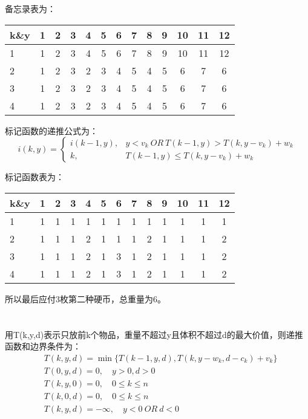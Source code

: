 \documentclass{article}
\begin{document}
\begin{CJK}{UTF8}{gbsn}
备忘录表为：
\begin{tabular}[t]{l|c|c|c|c|c|c|c|c|c|c|c|c}
\hline
k\&y & 1 & 2 & 3 & 4 & 5 & 6 & 7 & 8 & 9 & 10 & 11 & 12  \\
\hline
1   & 1  & 2 & 3 & 4 & 5 & 6 & 7 & 8 & 9 & 10 & 11 & 12  \\
\hline
2   & 1  & 2 & 3 & 2 & 3 & 4 & 5 & 4 & 5 & 6 & 7 & 6  \\
\hline
3   & 1  & 2 & 3 & 2 & 3 & 4 & 5 & 4 & 5 & 6 & 7 & 6  \\
\hline
4   & 1  & 2 & 3 & 2 & 3 & 4 & 5 & 4 & 5 & 6 & 7 & 6  \\
\hline
\end{tabular}

标记函数的递推公式为：
\begin{displaymath}
i(k,y)=\left\{
\begin{array}{ll}
i(k-1,y),   & y<v_k\ OR\ T(k-1,y) > T(k,y-v_k)+w_k \\
k,          & T(k-1,y) \le T(k,y-v_k)+w_k 
\end{array} \right.
\end{displaymath}

标记函数表为：
\begin{tabular}[t]{l|c|c|c|c|c|c|c|c|c|c|c|c}
\hline
k\&y & 1 & 2 & 3 & 4 & 5 & 6 & 7 & 8 & 9 & 10 & 11 & 12  \\
\hline
1   & 1 & 1 & 1 & 1 & 1 & 1 & 1 & 1 & 1 & 1 & 1 & 1 \\
\hline
2   & 1 & 1 & 1 & 2 & 1 & 1 & 1 & 2 & 1 & 1 & 1 & 2 \\
\hline
3   & 1 & 1 & 1 & 2 & 1 & 3 & 1 & 2 & 1 & 1 & 1 & 2 \\
\hline
4   & 1 & 1 & 1 & 2 & 1 & 3 & 1 & 2 & 1 & 1 & 1 & 2 \\
\hline
\end{tabular}

所以最后应付3枚第二种硬币，总重量为6。

\section{}
用T(k,y,d)表示只放前k个物品，重量不超过y且体积不超过d的最大价值，则递推函数和边界条件为：
\begin{align*}
& T(k,y,d)=\min\{T(k-1,y,d),T(k,y-w_k,d-c_k)+v_k\} \\
& T(0,y,d)=0, \quad y>0,d>0    \\
& T(k,y,0)=0, \quad 0 \le k\le n    \\
& T(k,0,d)=0, \quad 0 \le k\le n    \\
& T(k,y,d)=-\infty, \quad y<0\ OR\ d<0
\end{align*}


\end{CJK}
\end{document}
